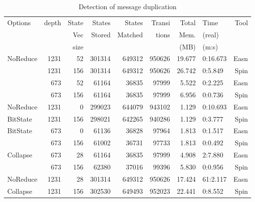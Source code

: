 \documentclass{entcs} \usepackage{entcsmacro}
\begin{document}
\begin{table}[ht]
\caption{Detection of message duplication}
\begin{center}
\begin{tabular}{||l|r|r|r|r|r|r|l|r||}
\hline
Options & depth & State & States & States  & Transi & Total & Time   &Tool\\
        &       & Vec   & Stored & Matched &  tions & Mem.  & (real) &    \\
        &       & size  &        &         &        & (MB)  & (m:s)  &      \\
\hline
NoReduce & 1231& 52& 301314& 649312& 950626& 19.677& 0:16.673& Easn\\ %
& 1231& 156& 301314& 649312& 950626& 26.742& 0:5.849&Spin\\ \hline
 & 673& 52& 61164& 36835& 97999& 5.522& 0:2.225& Easn\\ %
& 673& 156& 61164& 36835& 97999& 6.956& 0:0.736&Spin\\ \hline
 NoReduce & 1231& 0& 299023& 644079& 943102& 1.129& 0:10.693& Easn\\ %
BitState& 1231& 156& 298021& 642265& 940286& 1.129& 0:3.777&Spin\\ \hline
 BitState & 673& 0& 61136& 36828& 97964& 1.813& 0:1.517& Easn\\ %
 & 673& 156& 61002& 36731& 97733& 1.813& 0:0.492&  Spin\\ \hline
 Collapse & 673& 28& 61164& 36835& 97999& 4.908& 2:7.880& Easn\\ %
 & 673& 156& 62380& 37016& 99396& 5.830& 0:0.956& Spin\\ \hline
 NoReduce & 1231& 28& 301314& 649312& 950626& 17.424& 61:2.117&Easn\\ %
 Collapse & 1231& 156& 302530& 649493& 952023& 22.441& 0:8.552 & Spin\\
\hline
\end{tabular}
\end{center}
\end{table}
\end{document}
